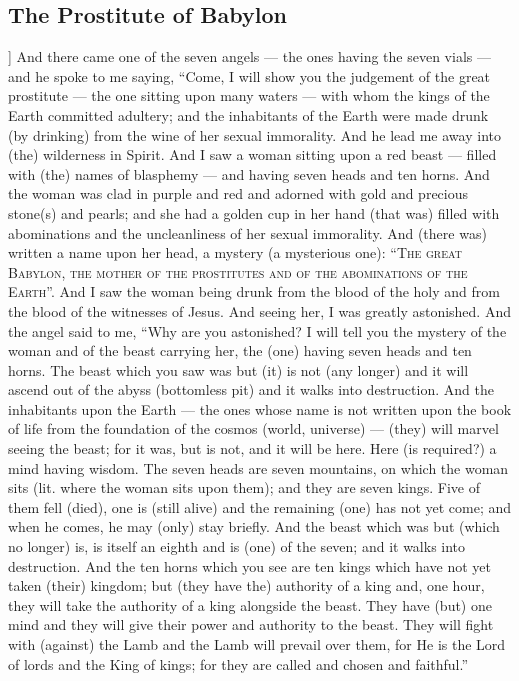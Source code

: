 \begin{pages}
\begin{Leftside}
        			\chapter{The Prostitute of Babylon}
				]		
		And there came one of the seven angels — the ones having the seven vials — and he spoke to me saying, “Come, I will show you the judgement of the great prostitute — the one sitting upon many waters — with whom the kings of the Earth committed adultery; and the inhabitants of the Earth were made drunk (by drinking) from the wine of her sexual immorality. 
		\pend
		\pstart
		And he lead me away into (the) wilderness in Spirit. And I saw a woman sitting upon a red beast — filled with (the) names of blasphemy — and having seven heads and ten horns. And the woman was clad in purple and red and adorned with gold and precious stone(s) and pearls; and she had a golden cup in her hand (that was) filled with abominations and the uncleanliness of her sexual immorality. And (there was) written a name upon her head, a mystery (a mysterious one): “\textsc{The great Babylon, the mother of the prostitutes and of the abominations of the Earth}”.
		\pend
		\pstart
		And I saw the woman being drunk from the blood of the holy and from the blood of the witnesses of Jesus. And seeing her, I was greatly astonished. And the angel said to me, “Why are you astonished? I will tell you the mystery of the woman and of the beast carrying her, the (one) having seven heads and ten horns. The beast which you saw was but (it) is not (any longer) and it will ascend out of the abyss (bottomless pit) and it walks into destruction. And the inhabitants upon the Earth — the ones whose name is not written upon the book of life from the foundation of the cosmos (world, universe) — (they) will marvel seeing the beast; for it was, but is not, and it will be here.
		\pend
		\pstart	
		Here (is required?) a mind having wisdom. The seven heads are seven mountains, on which the woman sits (lit. where the woman sits upon them); and they are seven kings. Five of them fell (died), one is (still alive) and the remaining (one) has not yet come; and when he comes, he may (only) stay briefly.
		\pend
		\pstart
		And the beast which was but (which no longer) is, is itself an eighth and is (one) of the seven; and it walks into destruction. And the ten horns which you see are ten kings which have not yet taken (their) kingdom; but (they have the) authority of a king and, one hour, they will take the authority of a king alongside the beast. They have (but) one mind and they will give their power and authority to the beast. They will fight with (against) the Lamb and the Lamb will prevail over them, for He is the Lord of lords and the King of kings; for they are called and chosen and faithful.”

\end{Leftside}
\end{pages}
